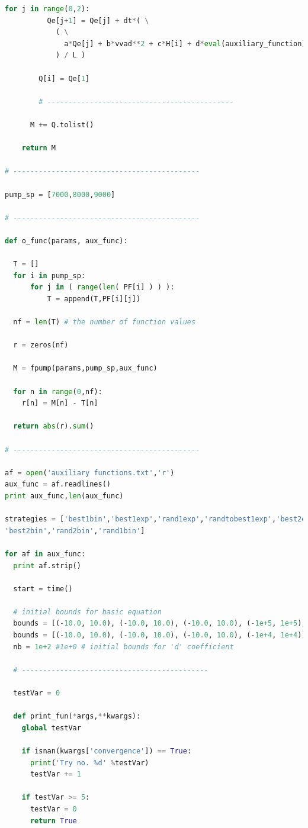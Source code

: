 \begin{lstlisting}[language=Python,caption={Процедура оптимизации на основе алгоритма дифференциальной эволюции на языке программирования Python},label={list:optimization_routine_diff}]
        for j in range(0,2):
          Qe[j+1] = Qe[j] + dt*( \
            ( \
              a*Qe[j] + b*vvad**2 + c*H[i] + d*eval(auxiliary_function) #
            ) / L )

        Q[i] = Qe[1]

        # --------------------------------------------
      
      M += Q.tolist()

    return M

# --------------------------------------------

pump_sp = [7000,8000,9000]

# --------------------------------------------

def o_func(params, aux_func):

  T = []
  for i in pump_sp:
      for j in ( range(len( PF[i] ) ) ):
          T = append(T,PF[i][j])

  nf = len(T) # the number of function values

  r = zeros(nf)

  M = fpump(params,pump_sp,aux_func)

  for n in range(0,nf):
    r[n] = M[n] - T[n]

  return abs(r).sum()

# --------------------------------------------

af = open('auxiliary functions.txt','r')
aux_func = af.readlines()
print aux_func,len(aux_func)

strategies = ['best1bin','best1exp','rand1exp','randtobest1exp','best2exp','rand2exp','randtobest1bin',\
'best2bin','rand2bin','rand1bin']

for af in aux_func:
  print af.strip()

  start = time()

  # initial bounds for basic equation
  bounds = [(-10.0, 10.0), (-10.0, 10.0), (-10.0, 10.0), (-1e+5, 1e+5), (-0.01, 0.01)] 
  bounds = [(-10.0, 10.0), (-10.0, 10.0), (-10.0, 10.0), (-1e+4, 1e+4)] 
  nb = 1e+2 #1e+0 # initial bounds for 'd' coefficient

  # --------------------------------------------
 
  testVar = 0

  def print_fun(*args,**kwargs):
    global testVar
    
    if isnan(kwargs['convergence']) == True:
      print('Try no. %d' %testVar)
      testVar += 1

    if testVar >= 5:
      testVar = 0
      return True 


\end{lstlisting}
